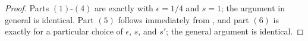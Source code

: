 \documentclass[12pt,letterpaper]{amsart}
\numberwithin{equation}{section}
\newtheorem{lemma}[equation]{Lemma}
\theoremstyle{remark}
\theoremstyle{definition}
\newcommand{\dd}{\partial}
\newcommand{\C}{\mathbb C}
\newcommand{\QQ}{\mathcal Q}
\begin{document}
	\begin{proof}
		Parts $(1)$-$(4)$ are exactly \cite[Proposition 2.5.2]{shishikura_1} with $\epsilon= 1/4$ and $s = 1$; the argument in general is identical.
		Part $(5)$  follows immediately from \cite[Proposition 2.6.2]{shishikura_1}, and part $(6)$ is exactly \cite[Lemma 3.5.1]{shishikura_1}
		for a particular choice of $\epsilon$, $s$, and $s'$; the general argument is identical.
%		
%		
%		
%		
%		

\end{proof}
\end{document}
